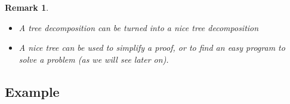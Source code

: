 \documentclass[8pt]{beamer}
\newtheorem*{remark}{Remark}
\begin{document}
\begin{frame}
\begin{definition}
\begin{tabular}{c|c|c|c}
    \end{tabular}
  \end{definition}

  \begin{remark}
    \begin{itemize}
    \item A tree decomposition can be turned into a nice tree decomposition
    \item A nice tree can be used to simplify a proof, or to find an easy program to solve a problem (as we will see later on).
    \end{itemize}
  \end{remark}
  

\end{frame}


\subsection{Example}
\end{document}

